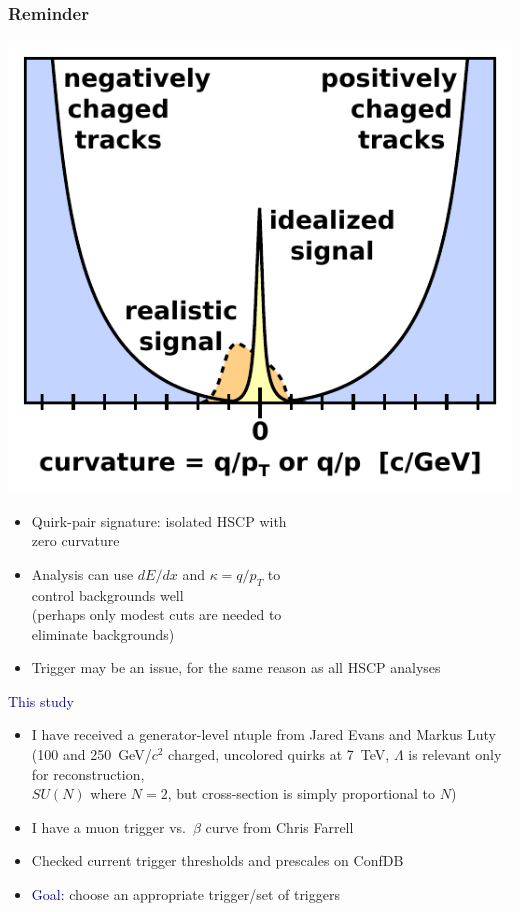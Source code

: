 \documentclass[compress]{beamer}
\begin{document}
\begin{frame}
\frametitle{Reminder}

\hfill \includegraphics[width=0.3\linewidth]{curvature_distribution.pdf}

\vspace{-3.3 cm}
\begin{itemize}
\item Quirk-pair signature: isolated HSCP with \\ zero curvature
\item Analysis can use $dE/dx$ and $\kappa = q/p_T$ to \\ control backgrounds well \\ (perhaps only modest cuts are needed to \\ eliminate backgrounds)
\item Trigger may be an issue, for the same reason as all HSCP analyses
\end{itemize}

\vspace{0.2 cm}
\hspace{-0.83 cm} \textcolor{darkblue}{\Large This study}
\vspace{0.1 cm}
\begin{itemize}
\item I have received a generator-level ntuple from Jared Evans and Markus Luty \\ {\tiny (100 and 250~GeV/$c^2$ charged, uncolored quirks at 7~TeV, $\Lambda$ is relevant only for reconstruction, \\ \vspace{-0.15 cm} $SU(N)$ where $N=2$, but cross-section is simply proportional to $N$)}
\item I have a muon trigger vs.\ $\beta$ curve from Chris Farrell
\item Checked current trigger thresholds and prescales on ConfDB
\item \textcolor{darkblue}{Goal:} choose an appropriate trigger/set of triggers
\end{itemize}
\end{frame}
\end{document}

